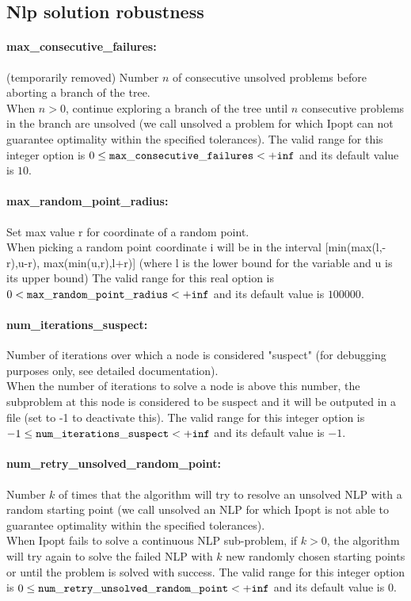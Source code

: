 \subsection{Nlp solution robustness}
\label{sec:Nlp_solution_robustness}
\paragraph{max\_consecutive\_failures:} (temporarily removed) Number $n$ of consecutive unsolved problems before aborting a branch of the tree. $\;$ \\
 When $n > 0$, continue exploring a branch of the
tree until $n$ consecutive problems in the branch
are unsolved (we call unsolved a problem for
which Ipopt can not guarantee optimality within
the specified tolerances). The valid range for this integer option is
$0 \le {\tt max\_consecutive\_failures } <  {\tt +inf}$
and its default value is $10$.


\paragraph{max\_random\_point\_radius:} Set max value r for coordinate of a random point. $\;$ \\
 When picking a random point coordinate i will be
in the interval [min(max(l,-r),u-r),
max(min(u,r),l+r)] (where l is the lower bound
for the variable and u is its upper bound) The valid range for this real option is 
$0 <  {\tt max\_random\_point\_radius } <  {\tt +inf}$
and its default value is $100000$.


\paragraph{num\_iterations\_suspect:} Number of iterations over which a node is considered "suspect" (for debugging purposes only, see detailed documentation). $\;$ \\
 When the number of iterations to solve a node is
above this number, the subproblem at this node is
considered to be suspect and it will be outputed
in a file (set to -1 to deactivate this). The valid range for this integer option is
$-1 \le {\tt num\_iterations\_suspect } <  {\tt +inf}$
and its default value is $-1$.


\paragraph{num\_retry\_unsolved\_random\_point:} Number $k$ of times that the algorithm will try to resolve an unsolved NLP with a random starting point (we call unsolved an NLP for which Ipopt is not able to guarantee optimality within the specified tolerances). $\;$ \\
 When Ipopt fails to solve a continuous NLP
sub-problem, if $k > 0$, the algorithm will try
again to solve the failed NLP with $k$ new
randomly chosen starting points  or until the
problem is solved with success. The valid range for this integer option is
$0 \le {\tt num\_retry\_unsolved\_random\_point } <  {\tt +inf}$
and its default value is $0$.


